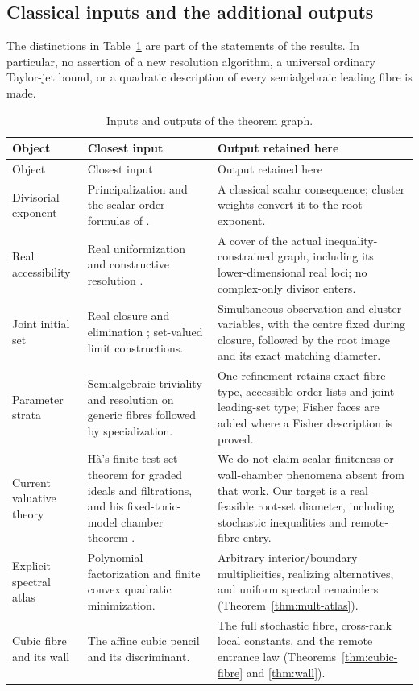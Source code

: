 \subsection*{Classical inputs and the additional outputs}
The distinctions in Table~\ref{tab:comparison} are part of the statements
of the results. In particular, no assertion of a new resolution algorithm,
a universal ordinary Taylor-jet bound, or a quadratic description of every
semialgebraic leading fibre is made.

\begin{longtable}{@{}>{\raggedright\arraybackslash}p{}>{\raggedright\arraybackslash}p{}>{\raggedright\arraybackslash}p{}@{}}
\caption{Inputs and outputs of the theorem graph.}\label{tab:comparison}\\
\toprule
Object & Closest input & Output retained here\\\midrule
\endfirsthead
\toprule Object & Closest input & Output retained here\\\midrule\endhead
Divisorial exponent & Principalization and the scalar order formulas of
\cite[Proposition 4.3, Theorem 4.8]{BE09}. & A classical scalar consequence;
cluster weights convert it to the root exponent.\\[4pt]
Real accessibility & Real uniformization and constructive resolution
\cite{BM88,BM97}. & A cover of the actual inequality-constrained graph,
including its lower-dimensional real loci; no complex-only divisor enters.\\[4pt]
Joint initial set & Real closure and elimination \cite{BCR98,BPR06};
set-valued limit constructions. & Simultaneous observation and cluster
variables, with the centre fixed during closure, followed by the root
image and its exact matching diameter.\\[4pt]
Parameter strata & Semialgebraic triviality \cite{Hardt80} and
resolution on generic fibres followed by specialization. & One refinement
retains exact-fibre type, accessible order lists and joint leading-set type;
Fisher faces are added where a Fisher description is proved.\\[4pt]
Current valuative theory & H\`a's finite-test-set theorem for graded ideals
and filtrations, and his fixed-toric-model chamber theorem
\cite[Theorems 5.8 and 12.3]{Ha26}. & We do not claim scalar finiteness or
wall-chamber phenomena absent from that work. Our target is a real feasible
root-set diameter, including stochastic inequalities and remote-fibre entry.\\[4pt]
Explicit spectral atlas & Polynomial factorization and finite convex
quadratic minimization. & Arbitrary interior/boundary multiplicities,
realizing alternatives, and uniform spectral remainders
(Theorem~\ref{thm:mult-atlas}).\\[4pt]
Cubic fibre and its wall & The affine cubic pencil and its discriminant. &
The full stochastic fibre, cross-rank local constants, and the remote
entrance law (Theorems~\ref{thm:cubic-fibre} and \ref{thm:wall}).\\
\bottomrule
\end{longtable}

